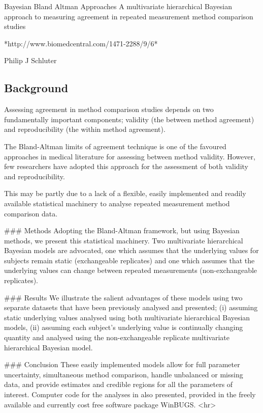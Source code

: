 Bayesian Bland Altman Approaches
A multivariate hierarchical Bayesian approach to measuring agreement in repeated
measurement method comparison studies

*http://www.biomedcentral.com/1471-2288/9/6*

Philip J Schluter

\subsection*{Background}
Assessing agreement in method comparison studies depends on two fundamentally important components; validity (the between method agreement) and reproducibility (the within method agreement). 

The Bland-Altman limits of agreement technique is one of the favoured approaches in medical literature for assessing between method validity. However, few researchers have adopted this approach for the assessment of both validity and reproducibility. 

This may be partly due to a lack of a flexible, easily implemented and readily available statistical machinery to analyse repeated measurement method comparison data.

### Methods
Adopting the Bland-Altman framework, but using Bayesian methods, we present this statistical machinery. Two multivariate hierarchical Bayesian models are advocated, one which assumes that the underlying values for subjects remain static (exchangeable replicates) and one which assumes that the underlying values can change between repeated measurements (non-exchangeable replicates).

### Results
We illustrate the salient advantages of these models using two separate datasets that have been previously analysed and presented; 
(i) assuming static underlying values analysed using both multivariate hierarchical Bayesian models,  
(ii) assuming each subject's underlying value is continually changing quantity and analysed using the non-exchangeable replicate multivariate hierarchical Bayesian model.  

### Conclusion
These easily implemented models allow for full parameter uncertainty, simultaneous method comparison, handle unbalanced or missing data, and provide estimates and credible regions for all the parameters of interest. Computer code for the analyses in also presented, provided in the freely available and currently cost free software package WinBUGS.
<hr>
